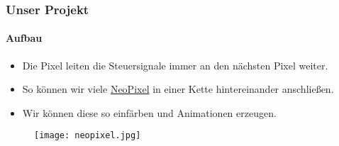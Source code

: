\begin{frame}
    \frametitle{Unser Projekt}
    \framesubtitle{Aufbau}
    \begin{minipage}{0.5\textwidth}
        \begin{itemize}
            \item Die Pixel leiten die Steuersignale immer an den nächsten Pixel weiter.
            \item So können wir viele \href{https://en.wikipedia.org/wiki/Adafruit_Industries\#NeoPixel}{NeoPixel} in einer Kette hintereinander anschließen.
            \item Wir können diese so einfärben und Animationen erzeugen.
        \end{itemize}
    \end{minipage} \hfill
    \begin{minipage}{0.45\textwidth}
        \begin{figure}
            \texttt{[image: neopixel.jpg]}
        \end{figure}
    \end{minipage}
\end{frame}

